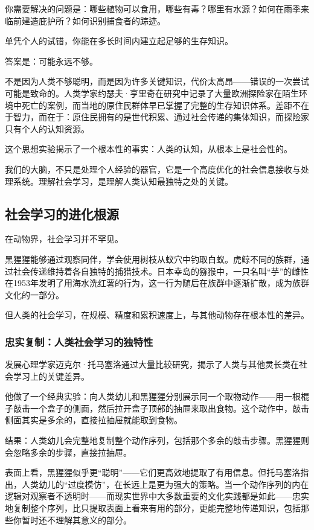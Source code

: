 \documentclass[11pt]{article}
\begin{document}
你需要解决的问题是：哪些植物可以食用，哪些有毒？哪里有水源？如何在雨季来临前建造庇护所？如何识别捕食者的踪迹。

单凭个人的试错，你能在多长时间内建立起足够的生存知识。

答案是：可能永远不够。

不是因为人类不够聪明，而是因为许多关键知识，代价太高昂——错误的一次尝试可能是致命的。人类学家约瑟夫·亨里奇在研究中记录了大量欧洲探险家在陌生环境中死亡的案例，而当地的原住民群体早已掌握了完整的生存知识体系。差距不在于智力，而在于：原住民拥有的是世代积累、通过社会传递的集体知识，而探险家只有个人的认知资源。

这个思想实验揭示了一个根本性的事实：人类的认知，从根本上是社会性的。

我们的大脑，不只是处理个人经验的器官，它是一个高度优化的社会信息接收与处理系统。理解社会学习，是理解人类认知最独特之处的关键。
\subsection{社会学习的进化根源}
\label{sec:org9a825fc}

在动物界，社会学习并不罕见。

黑猩猩能够通过观察同伴，学会使用树枝从蚁穴中钓取白蚁。虎鲸不同的族群，通过社会传递维持着各自独特的捕猎技术。日本幸岛的猕猴中，一只名叫“芋”的雌性在1953年发明了用海水洗红薯的行为，这一行为随后在族群中逐渐扩散，成为族群文化的一部分。

但人类的社会学习，在规模、精度和累积速度上，与其他动物存在根本性的差异。
\subsubsection{忠实复制：人类社会学习的独特性}
\label{sec:orgcc3165d}

发展心理学家迈克尔·托马塞洛通过大量比较研究，揭示了人类与其他灵长类在社会学习上的关键差异。

他做了一个经典实验：向人类幼儿和黑猩猩分别展示同一个取物动作——用一根棍子敲击一个盒子的侧面，然后拉开盒子顶部的抽屉来取出食物。这个动作中，敲击侧面其实是多余的，直接拉抽屉就能取到食物。

结果：人类幼儿会完整地复制整个动作序列，包括那个多余的敲击步骤。黑猩猩则会忽略多余的步骤，直接拉抽屉。

表面上看，黑猩猩似乎更“聪明”——它们更高效地提取了有用信息。但托马塞洛指出，人类幼儿的“过度模仿”，在长远上是更为强大的策略。当一个动作序列的内在逻辑对观察者不透明时——而现实世界中大多数重要的文化实践都是如此——忠实地复制整个序列，比只提取表面上看来有用的部分，更能完整地传递知识，包括那些你暂时还不理解其意义的部分。
\end{document}
